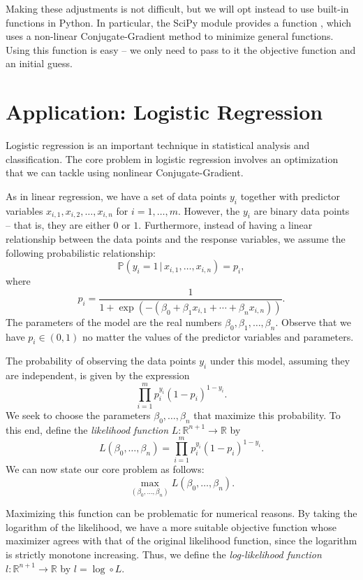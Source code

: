 Making these adjustments is not difficult, but we will opt instead to use built-in functions in Python. In particular,
the SciPy module  provides a function , which uses a non-linear Conjugate-Gradient method
to minimize general functions. Using this function is easy -- we only need to pass to it the objective function and an
initial guess.

\section*{Application: Logistic Regression}
Logistic regression is an important technique in statistical analysis and classification. The core problem in
logistic regression involves an optimization that we can tackle using nonlinear Conjugate-Gradient.

As in linear regression, we have a set of data points $y_i$ together with predictor variables
$x_{i,1}, x_{i,2}, \ldots, x_{i,n}$ for $i = 1, \ldots, m$. However, the $y_i$ are binary data points --
that is, they are either $0$ or $1$. Furthermore, instead of having a linear relationship between the
data points and the response variables, we assume the following probabilistic relationship:
\[
\mathbb{P}(y_i = 1 \, | \, x_{i,1}, \ldots, x_{i,n}) = p_i,
\]
where
\[
p_i = \frac{1}{1+\exp(-(\beta_0 + \beta_1x_{i,1} + \cdots + \beta_nx_{i,n}))}.
\]
The parameters of the model are the real numbers $\beta_0, \beta_1,\ldots, \beta_n$.
Observe that we have $p_i \in (0, 1)$ no matter the values of the predictor variables and parameters.

The probability of observing the data points $y_i$ under this model, assuming they are independent, is given by
the expression
\[
\prod_{i=1}^m p_i^{y_i}(1-p_i)^{1-y_i}.
\]
We seek to choose the parameters $\beta_0, \ldots, \beta_n$ that maximize this probability.
To this end, define the \emph{likelihood function} $L:\mathbb{R}^{n+1} \rightarrow \mathbb{R}$ by
\[
L(\beta_0, \ldots, \beta_n) = \prod_{i=1}^m p_i^{y_i}(1-p_i)^{1-y_i}.
\]
We can now state our core problem as follows:
\[
\max_{(\beta_0,\ldots,\beta_n)}L(\beta_0, \ldots, \beta_n).
\]

Maximizing this function can be problematic for numerical reasons. By taking the logarithm of the likelihood,
we have a more suitable objective function whose maximizer agrees with that of the original likelihood function,
since the logarithm is strictly monotone increasing. Thus, we define the \emph{log-likelihood function}
$l : \mathbb{R}^{n+1} \rightarrow \mathbb{R}$ by $l = \log \circ L$.

